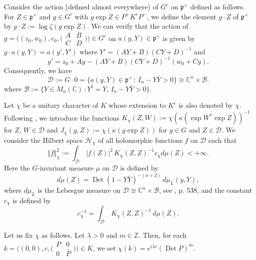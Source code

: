 \documentclass[12pt]{amsart}
\numberwithin{equation}{section}
\DeclareMathOperator{\Det}{Det} \DeclareMathOperator{\Tr}{Tr}
\begin{document}
Consider the action (defined almost everywhere) of $G^c$ on ${\mathfrak p}^+$ defined as follows.
For $Z\in {\mathfrak p}^+$ and
$g\in G^c$ with $g\exp Z \in P^+K^cP^-$, we define the element
$g\cdot Z$ of ${\mathfrak p}^+$ by $g\cdot Z:=\log \zeta (g\exp Z)$.
We can verify that
the action of $g=\bigl((z_0,w_0),c_0,\bigl(\begin{smallmatrix} A&B\\
C&D\end{smallmatrix}\bigr)\bigr)\in G^c$ on $a(y,Y)\in {\mathfrak
p}^+$ is given by $g\cdot a(y,Y)=a(y',Y')$ where
$Y'=(AY+B)(CY+D)^{-1}$ and
\begin{equation*}y'=z_0+Ay-(AY+B)(CY+D)^{-1}(w_0+Cy). \end{equation*}
Consequently, we have
\begin{equation*}{\mathcal D}:=G\cdot 0=\{a(y,Y)\in {\mathfrak
p}^+\,:\,I_n-Y{\bar Y}>0\}\cong {\mathbb C}^n\times {\mathcal B}.\end{equation*}
where ${\mathcal B}:=\{Y\in M_n({\mathbb C})\,:Y^t=Y,\,I_n-Y{\bar Y}>0\}$.

Let $\chi$ be a unitary character 
of $K$ whose extension to $K^c$ is also denoted by $\chi$.
Following \cite{Ne}, we introduce the functions $K_{\chi}(Z,W):=\chi ( \kappa (\exp W^{\ast}\exp Z))^{-1}$ for
$Z,\,W\in {\mathcal D}$ and $J_{\chi}(g,Z):=\chi(\kappa (g\exp Z))$
for $g\in G$ and $Z\in {\mathcal D}$. We consider the Hilbert space
${\mathcal H}_{\chi}$ of all holomorphic functions $f$ on $\mathcal D$ such
that
\begin{equation*}\Vert f\Vert
_{\chi}^2:=\int_{\mathcal D}\,\vert f(Z)\vert ^2\,
K_{\chi}(Z,Z)^{-1}c_{\chi}d\mu (Z)<+\infty. \end{equation*}
Here the $G$-invariant measure $\mu$ on $\mathcal D$ is defined by
\begin{equation*}d\mu(Z)=\Det (1-Y{\bar Y})^{-(n+2)}\,d\mu_L(y,Y),\end{equation*} 
where $d\mu_L$ is the Lebesgue measure on $\mathcal D\cong {\mathbb C}^n\times {\mathcal B}$, see \cite{Ne}, p. 538, and 
the constant $c_{\chi}$ is defined by
\begin{equation*}c_{\chi}^{-1}=\int_{\mathcal
D}\,K_{\chi}(Z,Z)^{-1}\,d\mu(Z).\end{equation*}

Let us fix $\chi$ as follows. Let $\lambda >0$ and $m\in {\mathbb Z}$. Then,
for each $k=\bigl((0,0),c,\bigl(\begin{smallmatrix} P&0\\
0&{\bar P}
\end{smallmatrix}\bigr)\bigr)\in K$, we set $\chi(k)=e^{i\lambda c}(\Det P)^{m}$.
\end{document}
